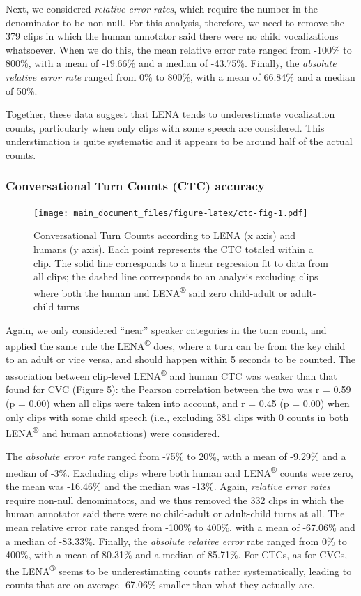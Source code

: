 \documentclass[english,table,man,floatsintext]{apa6}
\begin{document}
Next, we considered \emph{relative error rates}, which require the number in the denominator to be non-null. For this analysis, therefore, we need to remove the 379 clips in which the human annotator said there were no child vocalizations whatsoever. When we do this, the mean relative error rate ranged from -100\% to 800\%, with a mean of -19.66\% and a median of -43.75\%. Finally, the \emph{absolute relative error rate} ranged from 0\% to 800\%, with a mean of 66.84\% and a median of 50\%.

Together, these data suggest that LENA tends to underestimate vocalization counts, particularly when only clips with some speech are considered. This understimation is quite systematic and it appears to be around half of the actual counts.

\hypertarget{conversational-turn-counts-ctc-accuracy}{%
\subsubsection{Conversational Turn Counts (CTC) accuracy}\label{conversational-turn-counts-ctc-accuracy}}

\begin{figure}
\centering
\texttt{[image: main\_document\_files/figure-latex/ctc-fig-1.pdf]}
\caption{\label{fig:ctc-fig}Conversational Turn Counts according to LENA (x axis) and humans (y axis). Each point represents the CTC totaled within a clip. The solid line corresponds to a linear regression fit to data from all clips; the dashed line corresponds to an analysis excluding clips where both the human and LENA\textsuperscript{®} said zero child-adult or adult-child turns}
\end{figure}

Again, we only considered \enquote{near} speaker categories in the turn count, and applied the same rule the LENA\textsuperscript{®} does, where a turn can be from the key child to an adult or vice versa, and should happen within 5 seconds to be counted. The association between clip-level LENA\textsuperscript{®} and human CTC was weaker than that found for CVC (Figure 5): the Pearson correlation between the two was r = 0.59 (p = 0.00) when all clips were taken into account, and r = 0.45 (p = 0.00) when only clips with some child speech (i.e., excluding 381 clips with 0 counts in both LENA\textsuperscript{®} and human annotations) were considered.

The \emph{absolute error rate} ranged from -75\% to 20\%, with a mean of -9.29\% and a median of -3\%. Excluding clips where both human and LENA\textsuperscript{®} counts were zero,
the mean was -16.46\% and the median was -13\%. Again, \emph{relative error rates} require non-null denominators, and we thus removed the 332 clips in which the human annotator said there were no child-adult or adult-child turns at all. The mean relative error rate ranged from -100\% to 400\%, with a mean of -67.06\% and a median of -83.33\%. Finally, the \emph{absolute relative error} rate ranged from 0\% to 400\%, with a mean of 80.31\% and a median of 85.71\%. For CTCs, as for CVCs, the LENA\textsuperscript{®} seems to be underestimating counts rather systematically, leading to counts that are on average -67.06\% smaller than what they actually are.
\end{document}
